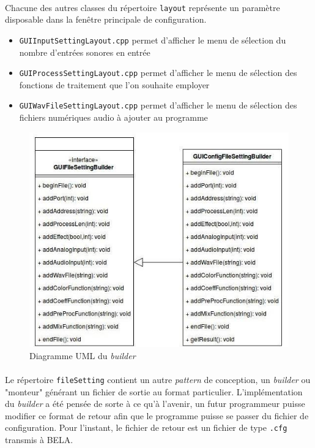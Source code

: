  \paragraph{}
 Chacune des autres classes du répertoire \verb!layout! représente un
 paramètre disposable dans la fenêtre principale de configuration.
 \begin{itemize}
  \item \verb!GUIInputSettingLayout.cpp! permet d'afficher le menu de sélection du nombre d'entrées sonores en entrée
  \item \verb!GUIProcessSettingLayout.cpp! permet d'afficher le menu de sélection des fonctions de traitement que l'on souhaite employer
  \item \verb!GUIWavFileSettingLayout.cpp! permet d'afficher le menu de sélection des fichiers numériques audio à ajouter au programme
 \end{itemize}
 
 
 \begin{figure}[H]
  \centering
  \includegraphics[scale=0.5]{assets/umlBuilder.png}
  \caption{Diagramme UML du \textit{builder}}
  \label{schéma global}
 \end{figure}
 
 \paragraph{}
 Le répertoire \verb!fileSetting! contient un autre \textit{pattern} de
 conception, un \textit{builder} ou "monteur" générant un fichier de sortie au
 format particulier. L'implémentation du \textit{builder} a été pensée de
 sorte à ce qu'à l'avenir, un futur programmeur puisse modifier ce format de
 retour afin que le programme puisse se passer du fichier de configuration.
 Pour l'instant, le fichier de retour est un fichier de type \verb!.cfg! transmis à BELA.
 
